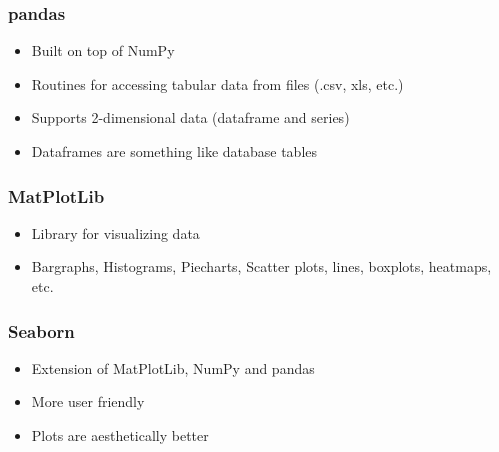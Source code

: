 \subsubsection{pandas}
\begin{itemize}
    \item Built on top of NumPy
    \item Routines for accessing tabular data from files (.csv, xls, etc.)
    \item Supports 2-dimensional data (dataframe and series)
    \item Dataframes are something like database tables
\end{itemize}

\subsubsection{MatPlotLib}
\begin{itemize}
    \item Library for visualizing data
    \item Bargraphs, Histograms, Piecharts, Scatter plots, lines, boxplots, heatmaps, etc.
\end{itemize}

\subsubsection{Seaborn}
\begin{itemize}
    \item Extension of MatPlotLib, NumPy and pandas
    \item More user friendly
    \item Plots are aesthetically better
\end{itemize}


